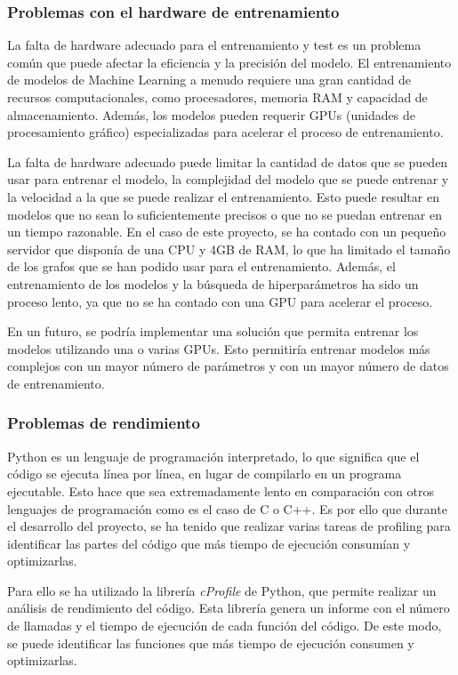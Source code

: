 \subsubsection{Problemas con el hardware de entrenamiento}
La falta de hardware adecuado para el entrenamiento y test es un problema común 
que puede afectar la eficiencia y la precisión del modelo. El entrenamiento de modelos 
de Machine Learning a menudo requiere una gran cantidad de recursos computacionales, 
como procesadores, memoria RAM y capacidad de almacenamiento. Además, los modelos 
pueden requerir GPUs (unidades de procesamiento gráfico) especializadas para acelerar 
el proceso de entrenamiento.\medskip

La falta de hardware adecuado puede limitar la cantidad de datos que se pueden usar 
para entrenar el modelo, la complejidad del modelo que se puede entrenar y la 
velocidad a la que se puede realizar el entrenamiento. Esto puede resultar en 
modelos que no sean lo suficientemente precisos o que no se puedan entrenar en 
un tiempo razonable. En el caso de este proyecto, se ha contado con un pequeño
servidor que disponía de una CPU y 4GB de RAM, lo que ha limitado el tamaño de los
grafos que se han podido usar para el entrenamiento. Además, el entrenamiento de
los modelos y la búsqueda de hiperparámetros ha sido un proceso lento, ya que
no se ha contado con una GPU para acelerar el proceso.\medskip

En un futuro, se podría implementar una solución que permita entrenar los modelos
utilizando una o varias GPUs. Esto permitiría entrenar modelos más complejos
con un mayor número de parámetros y con un mayor número de datos de entrenamiento.

\subsubsection{Problemas de rendimiento}
Python es un lenguaje de programación interpretado, lo que significa que el código
se ejecuta línea por línea, en lugar de compilarlo en un programa ejecutable. Esto
hace que sea extremadamente lento en comparación con otros lenguajes de programación
como es el caso de C o C++. Es por ello que durante el desarrollo del proyecto, se
ha tenido que realizar varias tareas de profiling para identificar las partes del
código que más tiempo de ejecución consumían y optimizarlas.\medskip

Para ello se ha utilizado la librería \textit{cProfile}\cite{cProfile} de Python, que permite
realizar un análisis de rendimiento del código. Esta librería genera un informe
con el número de llamadas y el tiempo de ejecución de cada función del código.
De este modo, se puede identificar las funciones que más tiempo de ejecución
consumen y optimizarlas.\medskip

